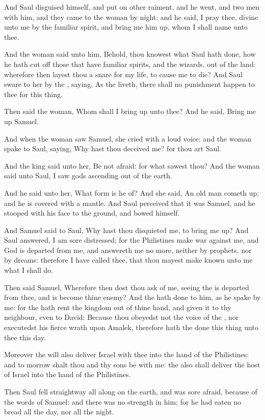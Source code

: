 \Verse And Saul disguised himself, and put on other raiment, and he went, and two men with him, and they came to the woman by night: and he said, I pray thee, divine unto me by the familiar spirit, and bring me him up, whom I shall name unto thee.

\Verse And the woman said unto him, Behold, thou knowest what Saul hath done, how he hath cut off those that have familiar spirits, and the wizards, out of the land: wherefore then layest thou a snare for my life, to cause me to die?  \Verse And Saul sware to her by the \LORD, saying, As the \LORD liveth, there shall no punishment happen to thee for this thing.

\Verse Then said the woman, Whom shall I bring up unto thee? And he said, Bring me up Samuel.

\Verse And when the woman saw Samuel, she cried with a loud voice: and the woman spake to Saul, saying, Why hast thou deceived me? for thou art Saul.

\Verse And the king said unto her, Be not afraid: for what sawest thou?  And the woman said unto Saul, I saw gods ascending out of the earth.

\Verse And he said unto her, What form is he of? And she said, An old man cometh up; and he is covered with a mantle. And Saul perceived that it was Samuel, and he stooped with his face to the ground, and bowed himself.

\Verse And Samuel said to Saul, Why hast thou disquieted me, to bring me up? And Saul answered, I am sore distressed; for the Philistines make war against me, and God is departed from me, and answereth me no more, neither by prophets, nor by dreams: therefore I have called thee, that thou mayest make known unto me what I shall do.

\Verse Then said Samuel, Wherefore then dost thou ask of me, seeing the \LORD is departed from thee, and is become thine enemy?  \Verse And the \LORD hath done to him, as he spake by me: for the \LORD hath rent the kingdom out of thine hand, and given it to thy neighbour, even to David: \Verse Because thou obeyedst not the voice of the \LORD, nor executedst his fierce wrath upon Amalek, therefore hath the \LORD done this thing unto thee this day.

\Verse Moreover the \LORD will also deliver Israel with thee into the hand of the Philistines: and to morrow shalt thou and thy sons be with me: the \LORD also shall deliver the host of Israel into the hand of the Philistines.

\Verse Then Saul fell straightway all along on the earth, and was sore afraid, because of the words of Samuel: and there was no strength in him; for he had eaten no bread all the day, nor all the night.

